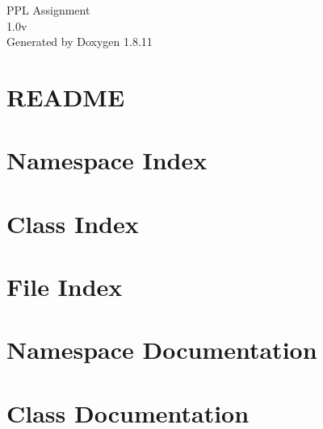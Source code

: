 \documentclass[twoside]{book}
\newcommand{\+}{\discretionary{\mbox{\scriptsize$\hookleftarrow$}}{}{}}
\newcommand{\clearemptydoublepage}{%
  \newpage{\pagestyle{empty}\cleardoublepage}%
}
\begin{document}
\hypersetup{pageanchor=false,
             bookmarksnumbered=true,
             pdfencoding=unicode
            }
\begin{titlepage}
\vspace*{7cm}
\begin{center}%
{\Large P\+PL Assignment \\[1ex]\large 1.\+0v }\\
\vspace*{1cm}
{\large Generated by Doxygen 1.8.11}\\
\end{center}
\end{titlepage}
\clearemptydoublepage
\tableofcontents
\clearemptydoublepage
{}
\hypersetup{pageanchor=true}

\chapter{R\+E\+A\+D\+ME}
\label{md_README}
\hypertarget{md_README}{}

\chapter{Namespace Index}

\chapter{Class Index}

\chapter{File Index}

\chapter{Namespace Documentation}

\chapter{Class Documentation}












\end{document}
